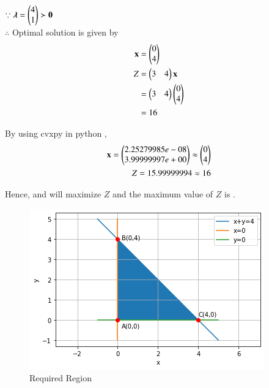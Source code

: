 \documentclass[journal,12pt,twocolumn]{IEEEtran}
\begin{document}
$\because \boldsymbol{\lambda}=\begin{pmatrix}4 \\ 1\end{pmatrix} \succ \mathbf{0} $
\\
$\therefore$ Optimal solution is given by
\begin{align}
    \mathbf{x} &= \begin{pmatrix}0\\4\end{pmatrix} \\
    Z &= \begin{pmatrix}3 & 4\end{pmatrix}\mathbf{x} \\
    &= \begin{pmatrix}3 & 4\end{pmatrix}\begin{pmatrix}0 \\ 4\end{pmatrix} \\
    &= 16
\end{align}

By using cvxpy in python ,
\begin{align}
    \mathbf{x}=\begin{pmatrix}2.25279985e-08\\3.99999997e+00\end{pmatrix} \approx \begin{pmatrix}0 \\ 4\end{pmatrix} \\
    Z = 15.99999994 \approx 16
\end{align}

Hence,  and  will maximize $Z$ and the maximum value of $Z$ is  .

\begin{figure}[!ht]
\centering
\includegraphics[width=\columnwidth]{Figure15}
\caption{Required Region}
\label{fig:Required Region}	
\end{figure}
\end{document}

